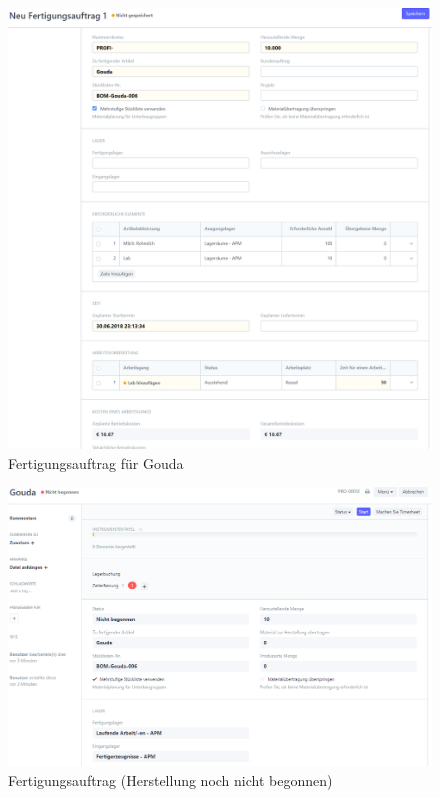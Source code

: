 \begin{figure}
  \centering
  \includegraphics[width=\textwidth]{Bilder/Fertigungsauftrag.PNG}
  \caption{Fertigungsauftrag für Gouda}
  \label{fig:fertAuftr}
\end{figure}
\begin{figure}
  \centering
  \includegraphics[width=\textwidth]{Bilder/Fertigungsauftrag_nicht_begonnen.PNG}
  \caption{Fertigungsauftrag (Herstellung noch nicht begonnen)}
  \label{fig:fertNichtBeg}
\end{figure}
